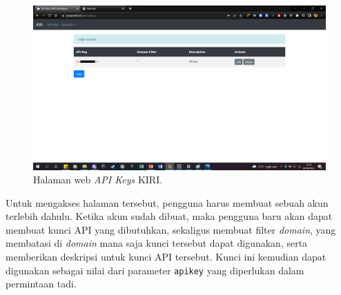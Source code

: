 \documentclass[a4paper,twoside]{article}
\begin{document}
\begin{enumerate}
\begin{figure}[t]
    \centering
    \includegraphics[width=0.75\linewidth]{projectkiri-apikey}
    \caption[Halaman web \textit{API Keys} KIRI.]{Halaman web \textit{API Keys} KIRI.}
    \label{fig:kiri-apikeypage}
\end{figure}

Untuk mengakses halaman tersebut, pengguna harus membuat sebuah akun terlebih dahulu. Ketika akun sudah dibuat, maka pengguna baru akan dapat membuat kunci API yang dibutuhkan, sekaligus membuat filter \textit{domain}, yang membatasi di \textit{domain} mana saja kunci tersebut dapat digunakan, serta memberikan deskripsi untuk kunci API tersebut. Kunci ini kemudian dapat digunakan sebagai nilai dari parameter \verb|apikey| yang diperlukan dalam permintaan tadi.


\end{enumerate}
\end{document}
